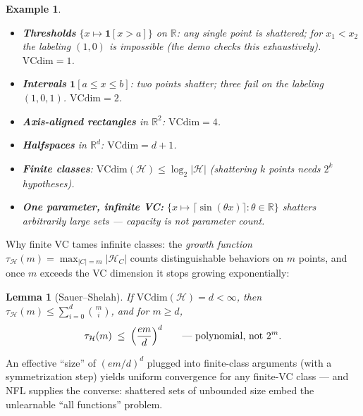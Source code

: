\documentclass[11pt]{article}
\newtheorem{lemma}{Lemma}
\newtheorem{example}{Example}
\newcommand{\Hyp}{\mathcal{H}}
\newcommand{\VC}{\mathrm{VCdim}}
\begin{document}
\begin{example}\leavevmode
\begin{itemize}
  \item \textbf{Thresholds} $\{x\mapsto\mathbf{1}[x> a]\}$ on
    $\mathbb{R}$: any single point is shattered; for $x_1<x_2$ the
    labeling $(1,0)$ is impossible (the demo checks this exhaustively).
    $\VC = 1$.
  \item \textbf{Intervals} $\mathbf{1}[a\le x\le b]$: two points shatter;
    three fail on the labeling $(1,0,1)$. $\VC = 2$.
  \item \textbf{Axis-aligned rectangles} in $\mathbb{R}^2$: $\VC = 4$.
  \item \textbf{Halfspaces} in $\mathbb{R}^d$: $\VC = d+1$.
  \item \textbf{Finite classes}: $\VC(\Hyp) \le \log_2|\Hyp|$
    (shattering $k$ points needs $2^k$ hypotheses).
  \item \textbf{One parameter, infinite VC:}
    $\{x \mapsto \lceil\sin(\theta x)\rceil : \theta\in\mathbb{R}\}$
    shatters arbitrarily large sets --- capacity is not parameter count.
\end{itemize}
\end{example}

Why finite VC tames infinite classes: the \emph{growth function}
$\tau_{\Hyp}(m) = \max_{|C|=m} |\Hyp_C|$ counts distinguishable behaviors
on $m$ points, and once $m$ exceeds the VC dimension it stops growing
exponentially:

\begin{lemma}[Sauer--Shelah]
If $\VC(\Hyp) = d < \infty$, then
$\tau_{\Hyp}(m) \le \sum_{i=0}^{d}\binom{m}{i}$, and for $m \ge d$,
\begin{equation}
  \tau_{\Hyp}(m) \;\le\; \Bigl(\frac{em}{d}\Bigr)^{d}
  \qquad\text{--- polynomial, not } 2^m .
  \label{eq:sauer}
\end{equation}
\end{lemma}

An effective ``size'' of $(em/d)^d$ plugged into finite-class arguments
(with a symmetrization step) yields uniform convergence for any
finite-VC class --- and NFL supplies the converse: shattered sets of
unbounded size embed the unlearnable ``all functions'' problem.
\end{document}
